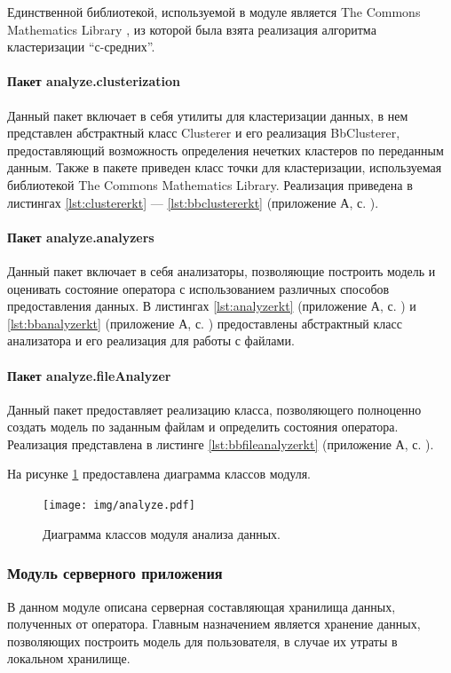 Единственной библиотекой, используемой в модуле является The Commons Mathematics Library \cite{apachemath3}, из которой была взята реализация алгоритма кластеризации ``с-средних''.

\paragraph{Пакет analyze.clusterization \newline}

Данный пакет включает в себя утилиты для кластеризации данных, в нем представлен абстрактный класс Clusterer и его реализация BbClusterer, предоставляющий возможность определения нечетких кластеров по переданным данным. Также в пакете приведен класс точки для кластеризации, используемая библиотекой The Commons Mathematics Library. Реализация приведена в листингах \ref{lst:clustererkt} --- \ref{lst:bbclustererkt} (приложение А, с. \pageref{chp:application-a}).

\paragraph{Пакет analyze.analyzers}

Данный пакет включает в себя анализаторы, позволяющие построить модель и оценивать состояние оператора с использованием различных способов предоставления данных. В листингах \ref{lst:analyzerkt} (приложение А, с. \pageref{chp:application-a}) и \ref{lst:bbanalyzerkt} (приложение А, с. \pageref{chp:application-a}) предоставлены абстрактный класс анализатора и его реализация для работы с файлами.

\paragraph{Пакет analyze.fileAnalyzer}
Данный пакет предоставляет реализацию класса, позволяющего полноценно создать модель по заданным файлам и определить состояния оператора. Реализация представлена в листинге \ref{lst:bbfileanalyzerkt} (приложение А, с. \pageref{chp:application-a}).

На рисунке \ref{fig:analyzerUml} предоставлена диаграмма классов модуля.

\begin{figure}[H]
	\centering
	\texttt{[image: img/analyze.pdf]}
	\caption{Диаграмма классов модуля анализа данных.}
	\label{fig:analyzerUml}
\end{figure}

\subsubsection{Модуль серверного приложения}
В данном модуле описана серверная составляющая хранилища данных, полученных от оператора. Главным назначением является хранение данных, позволяющих построить модель для пользователя, в случае их утраты в локальном хранилище.

